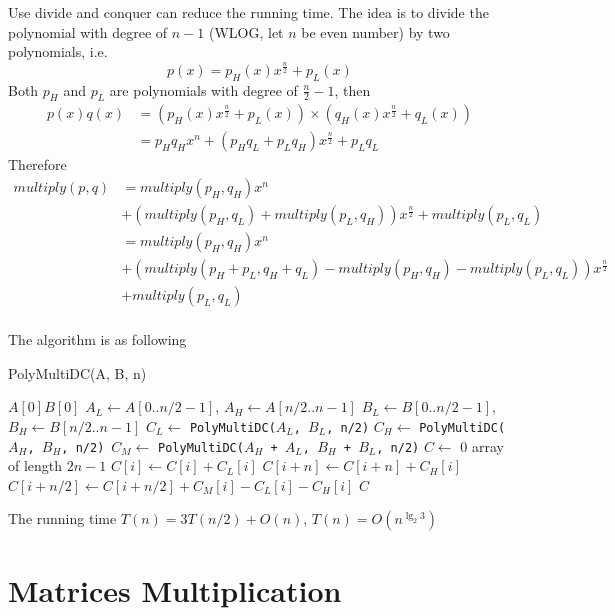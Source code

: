 			Use divide and conquer can reduce the running time. The idea is to divide the polynomial with degree of $n - 1$ (WLOG, let $n$ be even number) by two polynomials, i.e.
			\begin{equation}
				p(x) = p_H(x)x^{\frac{n}{2}} + p_L(x)
			\end{equation}
			Both $p_H$ and $p_L$ are polynomials with degree of $\frac{n}{2} - 1$, then
			\begin{align}
				p(x)q(x) &= (p_H(x)x^{\frac{n}{2}} + p_L(x)) \times (q_H(x)x^{\frac{n}{2}} + q_L(x))\\
						 &= p_Hq_H x^n + (p_Hq_L + p_Lq_H) x^{\frac{n}{2}} + p_Lq_L
			\end{align}
			Therefore
			\begin{align}
				multiply(p, q) &= multiply(p_H, q_H) x^n\\
							   &+ (multiply(p_H, q_L) + multiply(p_L, q_H)) x^{\frac{n}{2}} + multiply(p_L, q_L)\\
							   &= multiply(p_H, q_H) x^n\\
							   &+ (multiply(p_H + p_L, q_H + q_L) - multiply(p_H, q_H) - multiply(p_L, q_L)) x^{\frac{n}{2}} \\
							   &+ multiply(p_L, q_L)\\
			\end{align}

			The algorithm is as following
			\begin{algorithm}[h]
				\caption{PolyMultiDC(A, B, n)}
				\begin{algorithmic}[1]
						\Return $A[0]B[0]$
					\EndIf
					\State $A_L \gets A[0 .. n/2 - 1]$, $A_H \gets A[n/2 .. n - 1]$
					\State $B_L \gets B[0 .. n/2 - 1]$, $B_H \gets B[n/2 .. n - 1]$
					\State $C_L \gets $ \texttt{PolyMultiDC($A_L$, $B_L$, n/2)}
					\State $C_H \gets $ \texttt{PolyMultiDC($A_H$, $B_H$, n/2)}\
					\State $C_M \gets $ \texttt{PolyMultiDC($A_H$ + $A_L$, $B_H$ + $B_L$, n/2)}
					\State $C \gets $ 0 array of length $2n-1$
						\State $C[i] \gets C[i] + C_L[i]$
						\State $C[i + n] \gets C[i + n] + C_H[i]$
						\State $C[i + n/2] \gets C[i + n/2] + C_M[i] - C_L[i] - C_H[i]$
					\EndFor
					\Return $C$
				\end{algorithmic}
			\end{algorithm}

			The running time $T(n) = 3T(n/2) + O(n)$, $T(n) = O(n^{\lg_2 3})$
		\section{Matrices Multiplication}

